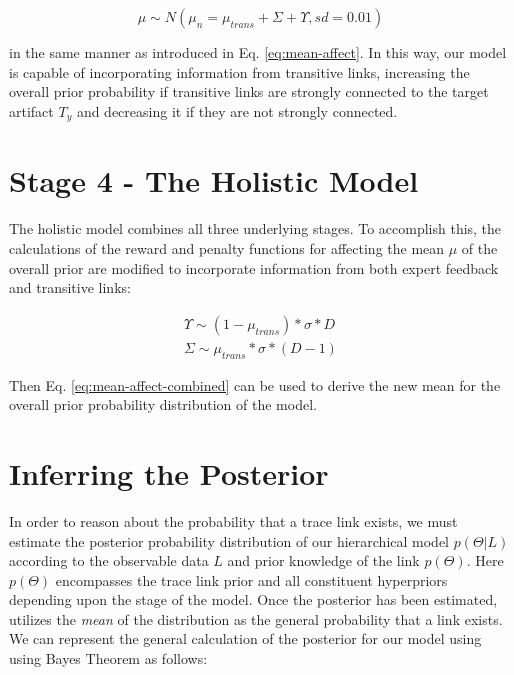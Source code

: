 \begin{equation}\label{eq:mean-affect-combined}
	\mu \sim N(\mu_n= \mu_{trans} + \Sigma + \Upsilon, sd=0.01)
\end{equation}

\noindent in the same manner as introduced in Eq. \ref{eq:mean-affect}. In this way, our model is capable of incorporating information from transitive links, increasing the overall prior probability if transitive links are strongly connected to the target artifact $T_y$ and decreasing it if they are not strongly connected.

\section{Stage 4 - The Holistic Model}
\label{sec:model-comp4}

The holistic model combines all three underlying stages. To accomplish this, the calculations of the reward and penalty functions for affecting the mean $\mu$ of the overall prior are modified to incorporate information from both expert feedback and transitive links:

\begin{equation}
\begin{split}
	\Upsilon \sim (1-\mu_{trans})*\sigma*D \\
	\Sigma \sim \mu_{trans}*\sigma*(D-1)
\end{split}
\end{equation}

\noindent Then Eq. \ref{eq:mean-affect-combined} can be used to derive the new mean for the overall prior probability distribution of the model.

\section{Inferring the Posterior}
\label{sec:model-posterior}

In order to reason about the probability that a trace link exists, we must estimate the posterior probability distribution of our hierarchical model $p(\Theta|L)$ according to the observable data $L$ and prior knowledge of the link $p(\Theta)$. Here $p(\Theta)$ encompasses the trace link prior and all constituent hyperpriors depending upon the stage of the model.  Once the posterior has been estimated, \Comet utilizes the \textit{mean} of the distribution as the general probability that a link exists. We can represent the general calculation of the posterior for our model using using Bayes Theorem as follows:  

